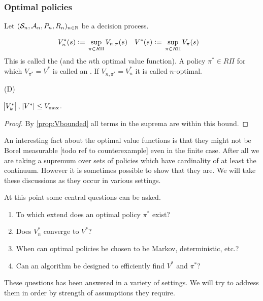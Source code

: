 \subsubsection{Optimal policies}

Let $(\mathcal{S}_n, \mathcal{A}_n, P_n, R_n)_{n \in \mathbb{N}}$ be a decision process.

\begin{defn} 
  \begin{align*}
    V_n^*(s) \vcentcolon= & \; \sup_{\pi \in R\Pi} V_{n,\pi}(s) &
    V^*(s) \vcentcolon= & \; \sup_{\pi \in R\Pi} V_\pi(s)
  \end{align*}
  This is called the  (and the $n$th
  optimal value function).
  A policy $\pi^* \in R\Pi$ for which $V_{\pi^*} = V^*$ is called an
  .
  If $V_{n, \pi^*} = V^*_n$ it is called $n$-optimal.
  \label{defn:optimalValue}
\end{defn}

\begin{prop} (D)

  $\abs{V^*_k},\; \abs{V^*} \leq V_{\max}$.
\end{prop}
\begin{proof}
  By \cref{prop:Vbounded} all terms in the suprema are within this bound.
\end{proof}

\begin{rem}
An interesting fact about the optimal value functions is that they
might not be Borel measurable [todo ref to counterexample]
even in the finite case.
After all we are taking a supremum over
sets of policies which have cardinality of at least the continuum.
However it is sometimes possible to show that they are.
We will take these discussions as they occur in various settings.
\end{rem}

At this point some central questions can be asked.
\begin{enumerate}
  \item To which extend does an optimal policy $\pi^*$ exist?
  \item Does $V_n^*$ converge to $V^*$?
  \item When can optimal policies be chosen to be Markov, deterministic, etc.?
  \item Can an algorithm be designed to efficiently find $V^*$ and
    $\pi^*$?
\end{enumerate}
These questions has been answered in a variety of settings.
We will try to address them in order by strength of assumptions
they require.

